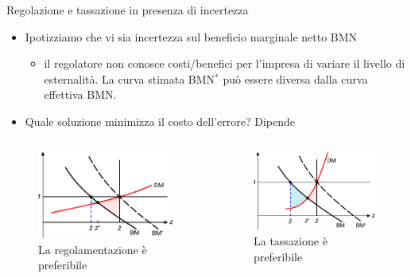 \documentclass[aspectratio=64,12pt]{beamer}
\begin{document}
\begin{frame}{Regolazione e tassazione in presenza di incertezza}
\begin{itemize}
\item Ipotizziamo che vi sia incertezza sul beneficio marginale netto BMN
\begin{itemize}
\item il regolatore non conosce costi/benefici per l'impresa di variare il
livello di esternalità. La curva stimata BMN$^*$ può essere diversa dalla
curva effettiva BMN.
\end{itemize}
\item Quale soluzione minimizza il costo dell'errore? Dipende
\end{itemize}
\begin{columns}
\begin{column}{.5\columnwidth}
\begin{figure} \centering
\includegraphics[width=\textwidth]{./figure/esternalita-6-color.pdf} La
regolamentazione è preferibile
\end{figure}
\end{column}

\begin{column}{.5\columnwidth}
\begin{figure} \centering
\includegraphics[width=\textwidth]{./figure/esternalita-7-color.pdf} La
tassazione è preferibile
\end{figure}
\end{column}
\end{columns}
\end{frame}
\end{document}
